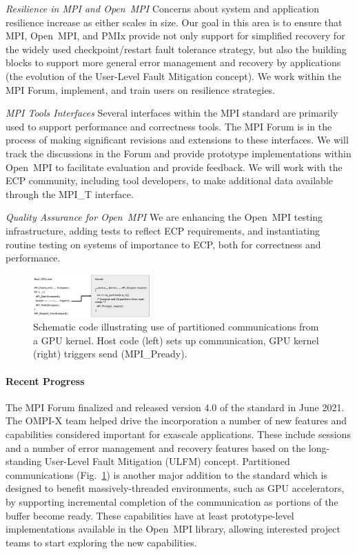 \emph{Resilience in MPI and Open~MPI} Concerns about system and
application resilience increase as either scales in size.  Our goal in
this area is to ensure that MPI, Open~MPI, and PMIx provide not only
support for simplified
recovery for the widely used checkpoint/restart fault tolerance strategy, but also the building
blocks to support more general error management and recovery by applications (the evolution of the User-Level
Fault Mitigation concept). We work within the MPI Forum, implement,
and train users on resilience strategies.

\emph{MPI Tools Interfaces}  Several interfaces within the
MPI standard are primarily used to support performance and
correctness tools.
The MPI Forum is in the process
of making significant revisions and extensions to these interfaces.
We will track the discussions in the Forum and provide prototype
implementations within Open~MPI to facilitate evaluation and provide
feedback.
We will work with the
ECP community, including tool developers, to make additional data
available through the MPI\_T interface.

\emph{Quality Assurance for Open~MPI}  We are enhancing the
Open~MPI testing infrastructure, adding tests to reflect ECP
requirements, and instantiating routine testing on systems of
importance to ECP, both for correctness and performance.

\begin{figure}
    \includegraphics[width=0.40\textwidth]{projects/2.3.1-PMR/2.3.1.17-OMPI-X/partitioned-comms-code.jpg}
    \caption{Schematic code illustrating use of partitioned communications from a GPU kernel.  
    Host code (left) sets up communication, GPU kernel (right) triggers send (MPI\_Pready).}
    \label{fig:partitioned-communications}
\end{figure}

\paragraph{Recent Progress}
The MPI Forum finalized and released version 4.0 of the standard in June 2021.  The OMPI-X team helped drive
the incorporation a number of new features and capabilities considered important for exascale applications.
These include sessions and a number of error management and recovery features
based on the long-standing User-Level Fault Mitigation (ULFM) concept.  Partitioned communications (Fig.~\ref{fig:partitioned-communications})
is another major addition to the standard which is designed to benefit massively-threaded environments, such as GPU accelerators, by supporting
incremental completion of the communication as portions of the buffer become ready.
These capabilities have at least prototype-level implementations available in the Open~MPI library, allowing interested project teams to start
exploring the new capabilities.  

